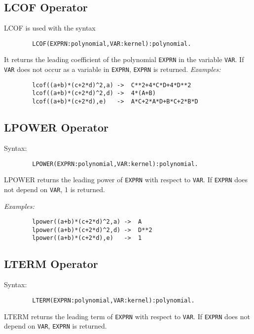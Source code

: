 \subsection{LCOF Operator}
\hypertarget{operator:LCOF}{}

LCOF is used with the syntax
\begin{verbatim}
        LCOF(EXPRN:polynomial,VAR:kernel):polynomial.
\end{verbatim}
It returns the leading coefficient of the
polynomial {\tt EXPRN} in the variable {\tt VAR}.  If {\tt VAR} does not
occur as a variable in {\tt EXPRN}, {\tt EXPRN} is returned.
\extendedmanual{\newpage}
{\it Examples:}
\begin{verbatim}
        lcof((a+b)*(c+2*d)^2,a) ->  C**2+4*C*D+4*D**2
        lcof((a+b)*(c+2*d)^2,d) ->  4*(A+B)
        lcof((a+b)*(c+2*d),e)   ->  A*C+2*A*D+B*C+2*B*D
\end{verbatim}

\subsection{LPOWER Operator}
\hypertarget{operator:LPOWER}{}

\begin{samepage}
Syntax:
\begin{verbatim}
        LPOWER(EXPRN:polynomial,VAR:kernel):polynomial.
\end{verbatim}
LPOWER returns the leading power of {\tt EXPRN} with respect to {\tt VAR}.
If {\tt EXPRN} does not depend on {\tt VAR}, 1 is returned.
\end{samepage}

{\it Examples:}
\begin{verbatim}
        lpower((a+b)*(c+2*d)^2,a) ->  A
        lpower((a+b)*(c+2*d)^2,d) ->  D**2
        lpower((a+b)*(c+2*d),e)   ->  1
\end{verbatim}

\subsection{LTERM Operator}
\hypertarget{operator:LTERM}{}

\begin{samepage}
Syntax:
\begin{verbatim}
        LTERM(EXPRN:polynomial,VAR:kernel):polynomial.
\end{verbatim}
LTERM returns the leading term of {\tt EXPRN} with respect to {\tt VAR}.
If {\tt EXPRN} does not depend on {\tt VAR}, {\tt EXPRN} is returned.
\end{samepage}

